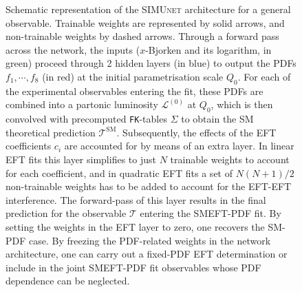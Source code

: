 \documentclass[withindex,glossary]{cam-thesis}
\newcommand{\simunet}{\textsc{SIMUnet}}
\begin{document}
\begin{figure}[t]
%
  \caption{Schematic representation of the \simunet{} architecture for a
    general observable.
    Trainable weights are represented by solid arrows, and
  non-trainable weights by dashed arrows.  Through a
  forward pass across the network, the inputs ($x$-Bjorken and its logarithm, in green) proceed through
  2 hidden layers (in blue) to output the PDFs $f_{1}, \cdots, f{_8}$ (in red) at
  the initial parametrisation scale $Q_0$.
  For each of the experimental observables entering the fit, these
  PDFs are combined into a partonic luminosity $\mathcal{L}^{(0)}$ at $Q_0$,
  which is then convolved with precomputed {\tt FK}-tables $\Sigma$ to obtain the SM
  theoretical prediction $\mathcal{T}^\text{SM}$.
  Subsequently, the effects of the EFT coefficients $c_i$
  are accounted for by means of an extra layer. In linear EFT fits this layer simplifies 
  to just $N$ trainable weights to account for each coefficient, and in quadratic EFT fits a set of 
  $N(N+1)/2$ non-trainable weights has to be added to account for the EFT-EFT interference. The forward-pass 
  of this layer results in the final prediction for the observable $\mathcal{T}$ entering the SMEFT-PDF fit.
  By setting the weights in the EFT layer to zero, one recovers the SM-PDF case.
  By freezing the PDF-related weights in the network architecture, one can carry out a fixed-PDF EFT
  determination or include in the joint  SMEFT-PDF fit observables whose PDF dependence can be neglected.
  \label{fig: architecture}}
\end{figure}
\end{document}
